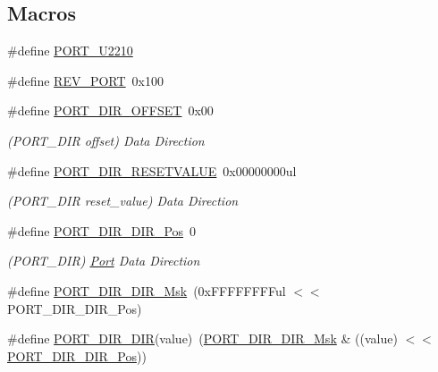 \subsection*{Macros}
\begin{DoxyCompactItemize}
\item 
\#define \mbox{\hyperlink{group___s_a_m_d21___p_o_r_t_ga5f5568d546a890f14a2dfa54f417a233}{P\+O\+R\+T\+\_\+\+U2210}}
\item 
\#define \mbox{\hyperlink{group___s_a_m_d21___p_o_r_t_ga48cafc8c658dd3e36eb503cd8069ff00}{R\+E\+V\+\_\+\+P\+O\+RT}}~0x100
\item 
\#define \mbox{\hyperlink{group___s_a_m_d21___p_o_r_t_gae80e64be75702d9047a0150d9c6eafb1}{P\+O\+R\+T\+\_\+\+D\+I\+R\+\_\+\+O\+F\+F\+S\+ET}}~0x00
\begin{DoxyCompactList}\small\item\em (P\+O\+R\+T\+\_\+\+D\+IR offset) Data Direction \end{DoxyCompactList}\item 
\#define \mbox{\hyperlink{group___s_a_m_d21___p_o_r_t_ga63e44bc52961c08e11fd93c736cdf35c}{P\+O\+R\+T\+\_\+\+D\+I\+R\+\_\+\+R\+E\+S\+E\+T\+V\+A\+L\+UE}}~0x00000000ul
\begin{DoxyCompactList}\small\item\em (P\+O\+R\+T\+\_\+\+D\+IR reset\+\_\+value) Data Direction \end{DoxyCompactList}\item 
\#define \mbox{\hyperlink{group___s_a_m_d21___p_o_r_t_ga24c8369138b85d0fa6b7acdf9f8c8734}{P\+O\+R\+T\+\_\+\+D\+I\+R\+\_\+\+D\+I\+R\+\_\+\+Pos}}~0
\begin{DoxyCompactList}\small\item\em (P\+O\+R\+T\+\_\+\+D\+IR) \mbox{\hyperlink{struct_port}{Port}} Data Direction \end{DoxyCompactList}\item 
\#define \mbox{\hyperlink{group___s_a_m_d21___p_o_r_t_ga37edf1972fbe60184737440da12c0a7f}{P\+O\+R\+T\+\_\+\+D\+I\+R\+\_\+\+D\+I\+R\+\_\+\+Msk}}~(0x\+F\+F\+F\+F\+F\+F\+F\+Ful $<$$<$ P\+O\+R\+T\+\_\+\+D\+I\+R\+\_\+\+D\+I\+R\+\_\+\+Pos)
\item 
\#define \mbox{\hyperlink{group___s_a_m_d21___p_o_r_t_ga87c01006429d0cd3c7d19b2ec7512231}{P\+O\+R\+T\+\_\+\+D\+I\+R\+\_\+\+D\+IR}}(value)~(\mbox{\hyperlink{group___s_a_m_d21___p_o_r_t_ga37edf1972fbe60184737440da12c0a7f}{P\+O\+R\+T\+\_\+\+D\+I\+R\+\_\+\+D\+I\+R\+\_\+\+Msk}} \& ((value) $<$$<$ \mbox{\hyperlink{group___s_a_m_d21___p_o_r_t_ga24c8369138b85d0fa6b7acdf9f8c8734}{P\+O\+R\+T\+\_\+\+D\+I\+R\+\_\+\+D\+I\+R\+\_\+\+Pos}}))

\end{DoxyCompactItemize}
